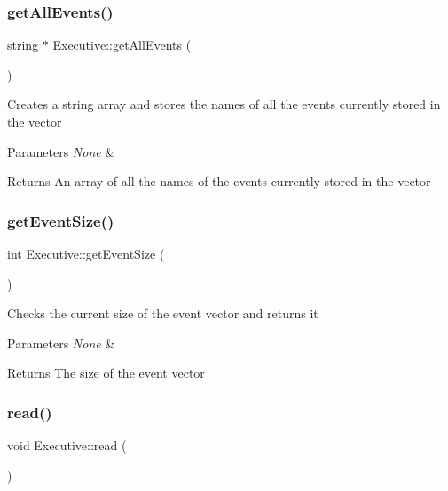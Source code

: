 \subsubsection{\texorpdfstring{get\+All\+Events()}{getAllEvents()}}
{\footnotesize\ttfamily string $\ast$ Executive\+::get\+All\+Events (\begin{DoxyParamCaption}{ }\end{DoxyParamCaption})}

Creates a string array and stores the names of all the events currently stored in the vector 
\begin{DoxyParams}{Parameters}
{\em None} & \\
\hline
\end{DoxyParams}
\begin{DoxyReturn}{Returns}
An array of all the names of the events currently stored in the vector 
\end{DoxyReturn}
\mbox{\label{class_executive_a325d611b8cd579647ee657c69560f28a}} 
\subsubsection{\texorpdfstring{get\+Event\+Size()}{getEventSize()}}
{\footnotesize\ttfamily int Executive\+::get\+Event\+Size (\begin{DoxyParamCaption}{ }\end{DoxyParamCaption})}

Checks the current size of the event vector and returns it 
\begin{DoxyParams}{Parameters}
{\em None} & \\
\hline
\end{DoxyParams}
\begin{DoxyReturn}{Returns}
The size of the event vector 
\end{DoxyReturn}
\mbox{\label{class_executive_a222ab3a86234f7476e769a285bf566a4}} 
\subsubsection{\texorpdfstring{read()}{read()}}
{\footnotesize\ttfamily void Executive\+::read (\begin{DoxyParamCaption}{ }\end{DoxyParamCaption})}

